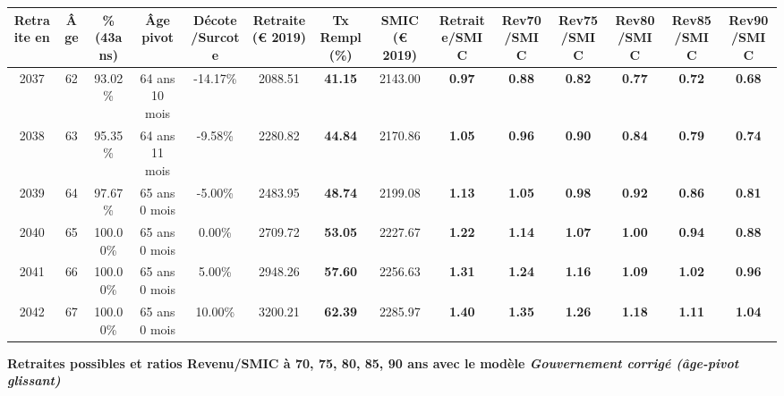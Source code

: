 \begin{adjustbox}{max width=\textwidth} 
\begin{tabular}[htb]{|c|c||c|c|c||c|c||c||c|c|c|c|c|c|} 
\hline 
 Retraite en &  Âge &  \%(43ans) &  Âge pivot &  Décote/Surcote &  Retraite (\euro{} 2019) &  Tx Rempl(\%) &  SMIC (\euro{} 2019) &  Retraite/SMIC &  Rev70/SMIC &  Rev75/SMIC &  Rev80/SMIC &  Rev85/SMIC &  Rev90/SMIC \\ 
\hline \hline 
 2037 &  62 &  93.02\% &  64 ans 10 mois &  -14.17\% &  2088.51 &  {\bf 41.15} &  2143.00 &  {\bf {\color{red} 0.97}} &  {\bf {\color{red} 0.88}} &  {\bf {\color{red} 0.82}} &  {\bf {\color{red} 0.77}} &  {\bf {\color{red} 0.72}} &  {\bf {\color{red} 0.68}} \\ 
\hline 
 2038 &  63 &  95.35\% &  64 ans 11 mois &  -9.58\% &  2280.82 &  {\bf 44.84} &  2170.86 &  {\bf 1.05} &  {\bf {\color{red} 0.96}} &  {\bf {\color{red} 0.90}} &  {\bf {\color{red} 0.84}} &  {\bf {\color{red} 0.79}} &  {\bf {\color{red} 0.74}} \\ 
\hline 
 2039 &  64 &  97.67\% &  65 ans 0 mois &  -5.00\% &  2483.95 &  {\bf 48.74} &  2199.08 &  {\bf 1.13} &  {\bf 1.05} &  {\bf {\color{red} 0.98}} &  {\bf {\color{red} 0.92}} &  {\bf {\color{red} 0.86}} &  {\bf {\color{red} 0.81}} \\ 
\hline 
 2040 &  65 &  100.00\% &  65 ans 0 mois &  0.00\% &  2709.72 &  {\bf 53.05} &  2227.67 &  {\bf 1.22} &  {\bf 1.14} &  {\bf 1.07} &  {\bf 1.00} &  {\bf {\color{red} 0.94}} &  {\bf {\color{red} 0.88}} \\ 
\hline 
 2041 &  66 &  100.00\% &  65 ans 0 mois &  5.00\% &  2948.26 &  {\bf 57.60} &  2256.63 &  {\bf 1.31} &  {\bf 1.24} &  {\bf 1.16} &  {\bf 1.09} &  {\bf 1.02} &  {\bf {\color{red} 0.96}} \\ 
\hline 
 2042 &  67 &  100.00\% &  65 ans 0 mois &  10.00\% &  3200.21 &  {\bf 62.39} &  2285.97 &  {\bf 1.40} &  {\bf 1.35} &  {\bf 1.26} &  {\bf 1.18} &  {\bf 1.11} &  {\bf 1.04} \\ 
\hline 
\hline 
\end{tabular} 
\end{adjustbox} 
 
 \vspace{0.1cm} 
{\bf \noindent Retraites possibles et ratios Revenu/SMIC à 70, 75, 80, 85, 90 ans avec le modèle \emph{Gouvernement corrigé (âge-pivot glissant)}}  
 
